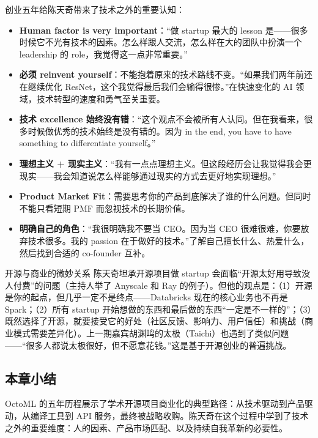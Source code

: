 \documentclass[a4paper]{article}
\begin{document}
创业五年给陈天奇带来了技术之外的重要认知：

\begin{itemize}
    \item \textbf{Human factor is very important}：``做 startup 最大的 lesson 是------很多时候它不光有技术的因素。怎么样跟人交流，怎么样在大的团队中扮演一个 leadership 的 role，我觉得这一点非常重要。''
    \item \textbf{必须 reinvent yourself}：不能抱着原来的技术路线不变。``如果我们两年前还在继续优化 ResNet，这个我觉得最后我们会输得很惨。''在快速变化的 AI 领域，技术转型的速度和勇气至关重要。
    \item \textbf{技术 excellence 始终没有错}：``这个观点不会被所有人认同。但在我看来，很多时候做优秀的技术始终是没有错的。因为 in the end, you have to have something to differentiate yourself。''
    \item \textbf{理想主义 + 现实主义}：``我有一点点理想主义。但这段经历会让我觉得我会更现实------我会知道说怎么样能够通过现实的方式去更好地实现理想。''
    \item \textbf{Product Market Fit}：需要思考你的产品到底解决了谁的什么问题。但同时不能只看短期 PMF 而忽视技术的长期价值。
    \item \textbf{明确自己的角色}：``我很明确我不要当 CEO。因为当 CEO 很难很难，你要放弃技术很多。我的 passion 在于做好的技术。''了解自己擅长什么、热爱什么，然后找到合适的 co-founder 互补。
\end{itemize}

\begin{warningbox}{开源与商业的微妙关系}
陈天奇坦承开源项目做 startup 会面临``开源太好用导致没人付费''的问题（主持人举了 Anyscale 和 Ray 的例子）。但他的观点是：（1）开源是你的起点，但几乎一定不是终点------Databricks 现在的核心业务也不再是 Spark；（2）所有 startup 开始想做的东西和最后做的东西``一定是不一样的''；（3）既然选择了开源，就要接受它的好处（社区反馈、影响力、用户信任）和挑战（商业模式需要差异化）。上一期嘉宾胡渊鸣的太极（Taichi）也遇到了类似问题------``很多人都说太极很好，但不愿意花钱。''这是基于开源创业的普遍挑战。
\end{warningbox}

\subsection{本章小结}

OctoML 的五年历程展示了学术开源项目商业化的典型路径：从技术驱动到产品驱动，从编译工具到 API 服务，最终被战略收购。陈天奇在这个过程中学到了技术之外的重要维度：人的因素、产品市场匹配、以及持续自我革新的必要性。
\end{document}
